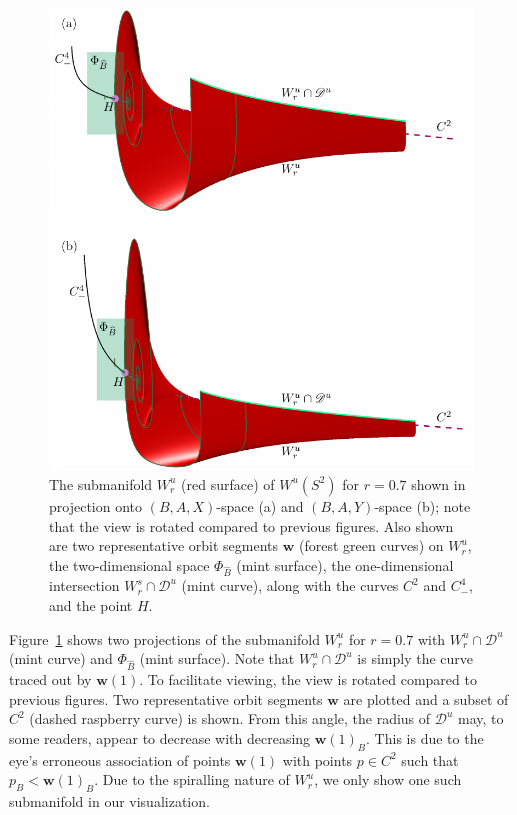 \documentclass{ws-ijbc}
\begin{document}
\begin{figure}[t!]
\centering
\includegraphics[]{./figures/MKMO_8.pdf}
\caption{The submanifold $W^u_{r}$ (red surface) of $W^u(S^2)$ for $r=0.7$ shown in projection onto $(B,A,X)$-space (a) and $(B,A,Y)$-space (b); note that the view is rotated compared to previous figures.  Also shown are two representative orbit segments $\mathbf{w}$ (forest green curves) on $W^u_{r}$, the two-dimensional space $\Phi_{\widehat{B}}$ (mint surface), the one-dimensional intersection $W^s_{r}\cap\mathscr{D}^u$ (mint curve), along with the curves $C^2$ and $C^4_-$, and the point $H$.}
\label{figure_8}
\end{figure}

Figure~\ref{figure_8} shows two projections of the submanifold $W^u_{r}$ for $r=0.7$ with $W^u_{r} \cap \mathscr{D}^u$ (mint curve) and $\Phi_{\widehat{B}}$ (mint surface).  Note that $W^u_{r}\cap\mathscr{D}^u$ is simply the curve traced out by $\mathbf{w}(1)$.  To facilitate viewing, the view is rotated compared to previous figures.  Two representative orbit segments $\mathbf{w}$ are plotted and a subset of $C^2$ (dashed raspberry curve) is shown.  From this angle, the radius of $\mathscr{D}^u$ may, to some readers, appear to decrease with decreasing $\mathbf{w}(1)_B$.  This is due to the eye's erroneous association of points $\mathbf{w}(1)$ with points $p \in C^2$ such that $p_B < \mathbf{w}(1)_B$.  Due to the spiralling nature of $W^u_r$, we only show one such submanifold in our visualization.
\end{document}
